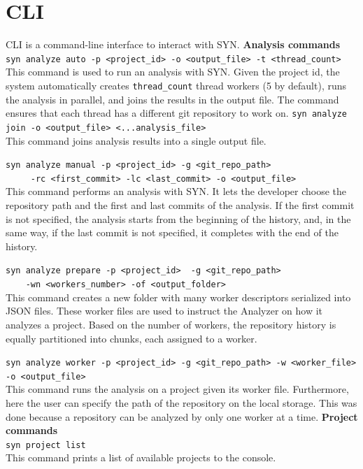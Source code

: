 \section{CLI}
CLI is a command-line interface to interact with SYN.
\bigbreak
\noindent
\textbf{Analysis commands}\\
\noindent
\verb|syn analyze auto -p <project_id> -o <output_file> -t <thread_count>|\\
\indent
This command is used to run an analysis with SYN. 
Given the project id, the system automatically creates \texttt{thread\_count} thread workers (5 by default), runs the analysis in parallel, and joins the results in the output file. The command ensures that each thread has a different git repository to work on. 
\bigbreak
\noindent
\verb|syn analyze join -o <output_file> <...analysis_file>|\\
\indent
This command joins analysis results into a single output file.

\bigbreak
\noindent
\verb|syn analyze manual -p <project_id> -g <git_repo_path> | \\
\verb|     -rc <first_commit> -lc <last_commit> -o <output_file>|\\
\indent
This command performs an analysis with SYN. It lets the developer choose the repository path and the first and last commits of the analysis. 
If the first commit is not specified, the analysis starts from the beginning of the history, and, in the same way, if the last commit is not specified, it completes with the end of the history. 


\bigbreak
\noindent
\verb|syn analyze prepare -p <project_id>  -g <git_repo_path> |\\
\verb|    -wn <workers_number> -of <output_folder>| \\
\indent
This command creates a new folder with many worker descriptors serialized into JSON files. These worker files are used to instruct the Analyzer on how it analyzes a project.
Based on the number of workers, the repository history is equally partitioned into chunks, each assigned to a worker. 


\bigbreak
\noindent
\verb|syn analyze worker -p <project_id> -g <git_repo_path> -w <worker_file> -o <output_file>|\\
\indent
This command runs the analysis on a project given its worker file. 
Furthermore, here the user can specify the path of the repository on the local storage. This was done because a repository can be analyzed by only one worker at a time.
\bigbreak
\noindent
\textbf{Project commands}\\
\noindent
\verb|syn project list| \\
\indent
This command prints a list of available projects to the console.

